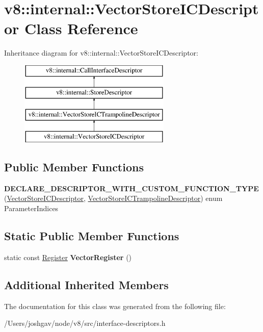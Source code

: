 \hypertarget{classv8_1_1internal_1_1_vector_store_i_c_descriptor}{}\section{v8\+:\+:internal\+:\+:Vector\+Store\+I\+C\+Descriptor Class Reference}
\label{classv8_1_1internal_1_1_vector_store_i_c_descriptor}
Inheritance diagram for v8\+:\+:internal\+:\+:Vector\+Store\+I\+C\+Descriptor\+:\begin{figure}[H]
\begin{center}
\leavevmode
\includegraphics[height=4.000000cm]{classv8_1_1internal_1_1_vector_store_i_c_descriptor}
\end{center}
\end{figure}
\subsection*{Public Member Functions}
\begin{DoxyCompactItemize}
\item 
{\bfseries D\+E\+C\+L\+A\+R\+E\+\_\+\+D\+E\+S\+C\+R\+I\+P\+T\+O\+R\+\_\+\+W\+I\+T\+H\+\_\+\+C\+U\+S\+T\+O\+M\+\_\+\+F\+U\+N\+C\+T\+I\+O\+N\+\_\+\+T\+Y\+PE} (\hyperlink{classv8_1_1internal_1_1_vector_store_i_c_descriptor}{Vector\+Store\+I\+C\+Descriptor}, \hyperlink{classv8_1_1internal_1_1_vector_store_i_c_trampoline_descriptor}{Vector\+Store\+I\+C\+Trampoline\+Descriptor}) enum Parameter\+Indices\hypertarget{classv8_1_1internal_1_1_vector_store_i_c_descriptor_a327f493b189c904af94167439fd7eed8}{}\label{classv8_1_1internal_1_1_vector_store_i_c_descriptor_a327f493b189c904af94167439fd7eed8}

\end{DoxyCompactItemize}
\subsection*{Static Public Member Functions}
\begin{DoxyCompactItemize}
\item 
static const \hyperlink{structv8_1_1internal_1_1_register}{Register} {\bfseries Vector\+Register} ()\hypertarget{classv8_1_1internal_1_1_vector_store_i_c_descriptor_a6fe98cbda33723b23b169854a4595576}{}\label{classv8_1_1internal_1_1_vector_store_i_c_descriptor_a6fe98cbda33723b23b169854a4595576}

\end{DoxyCompactItemize}
\subsection*{Additional Inherited Members}


The documentation for this class was generated from the following file\+:\begin{DoxyCompactItemize}
\item 
/\+Users/joshgav/node/v8/src/interface-\/descriptors.\+h\end{DoxyCompactItemize}

